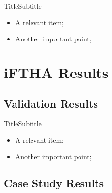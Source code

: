     \begin{frame}{Title}{Subtitle}\vspace*{-2em}
        \begin{itemize}
            \item<2->  A \alert{relevant} item;
            \item<3->  Another \alert{important} point;
        \end{itemize}
    \end{frame}

\section{iFTHA Results}

\subsection{Validation Results}

    \begin{frame}{Title}{Subtitle}\vspace*{-2em}
        \begin{itemize}
            \item<2->  A \alert{relevant} item;
            \item<3->  Another \alert{important} point;
        \end{itemize}
    \end{frame}

\subsection{Case Study Results}

